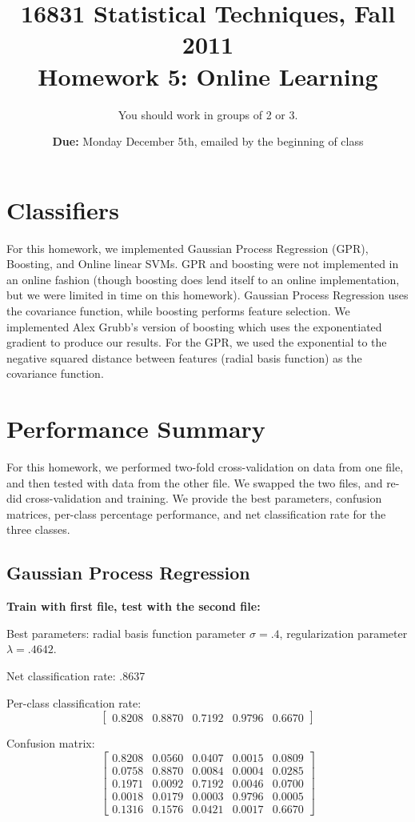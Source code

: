 \documentclass[letterpaper]{article}
\title{16831 Statistical Techniques, Fall 2011\\Homework 5: Online Learning}
\date{\textbf{Due:} Monday December 5th, emailed by the beginning of class}
\author{You should work in groups of 2 or 3.}
\begin{document}
\maketitle

\section*{Classifiers}

For this homework, we implemented Gaussian Process Regression (GPR), Boosting, and Online linear SVMs. GPR and boosting were not implemented in an online fashion (though boosting does lend itself to an online implementation, but we were limited in time on this homework). Gaussian Process Regression uses the covariance function, while boosting performs feature selection. We implemented Alex Grubb's version of boosting which uses the exponentiated gradient to produce our results. For the GPR, we used the exponential to the negative squared distance between features (radial basis function) as the covariance function.

\section*{Performance Summary}

For this homework, we performed two-fold cross-validation on data from one file, and then tested with data from the other file. We swapped the two files, and re-did cross-validation and training. We provide the best parameters, confusion matrices, per-class percentage performance, and net classification rate for the three classes. 

\subsection*{Gaussian Process Regression}

\textbf{Train with first file, test with the second file:}

Best parameters: radial basis function parameter $\sigma=.4$, regularization parameter $\lambda=.4642$.

Net classification rate: .8637

Per-class classification rate: 
$$\begin{bmatrix}0.8208   & 0.8870  &  0.7192   & 0.9796 &   0.6670\end{bmatrix}$$

Confusion matrix:
$$\begin{bmatrix}
0.8208 &   0.0560  & 0.0407 &   0.0015  &  0.0809\\
    0.0758&    0.8870 &   0.0084&    0.0004 &   0.0285\\
    0.1971   & 0.0092   & 0.7192  &  0.0046   & 0.0700\\
    0.0018   & 0.0179    &0.0003  &  0.9796  &  0.0005\\
    0.1316   &0.1576    &0.0421  &  0.0017  &  0.6670
\end{bmatrix}$$
\end{document}
